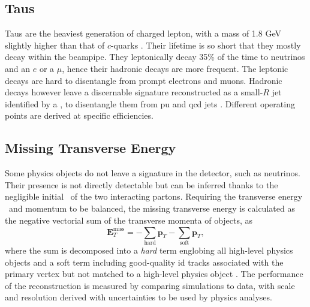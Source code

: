 \subsection{Taus}\label{sec-atlas-tau}
Taus are the heaviest generation of charged lepton, with a mass of 1.8 GeV slightly higher than that of $c$-quarks \cite{Tanabashi:2018oca}. Their lifetime is so short that they mostly decay within the beampipe. They leptonically decay 35\% of the time to neutrinos and an $e$ or a $\mu$, hence their hadronic decays are more frequent. The leptonic decays are hard to disentangle from prompt electrons and muons. Hadronic decays however leave a discernable signature reconstructed as a small-$R$ jet identified by a , to disentangle them from \gls{pu} and \gls{qcd} jets \cite{ATL-PHYS-PUB-2019-033}. Different operating points are derived at specific efficiencies. 

\subsection{Missing Transverse Energy}\label{sec-atlas-met}
Some physics objects do not leave a signature in the detector, such as neutrinos. Their presence is not directly detectable but can be inferred thanks to the negligible initial \pt\ of the two interacting partons. Requiring the transverse energy \etm\ and momentum to be balanced, the missing transverse energy is calculated as the negative vectorial sum of the transverse momenta of objects, as
\begin{equation}
  \boldsymbol{E}_T^{\text{miss}} = - \sum_{\text{hard}} \boldsymbol{p}_T - \sum_{\text{soft}} \boldsymbol{p}_T,
\end{equation}
where the sum is decomposed into a \textit{hard} term englobing all high-level physics objects and a soft term including good-quality \gls{id} tracks associated with the primary vertex but not matched to a high-level physics object \cite{ATLASmetReco}. The performance of the reconstruction is measured by comparing simulations to data, with scale and resolution derived with uncertainties to be used by physics analyses. 